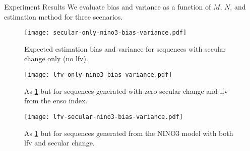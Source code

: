 \begin{block}{Experiment Results}
  We evaluate bias and variance as a function of $M$, $N$, and estimation method for three scenarios.
  \begin{figure}
    \centering
    \texttt{[image: secular-only-nino3-bias-variance.pdf]}
    \caption{
      Expected estimation bias and variance for sequences with secular change only (no \gls{lfv}).
    }\label{fig:secular-nino3-bias-variance}
  \end{figure}
  \begin{figure}
    \centering
    \texttt{[image: lfv-only-nino3-bias-variance.pdf]}
    \caption{
      As \cref{fig:secular-nino3-bias-variance} but for sequences generated with zero secular change and \gls{lfv} from the \gls{enso} index.
    }\label{fig:lfv-nino3-bias-variance}
  \end{figure}
  \begin{figure}
    \centering
    \texttt{[image: lfv-secular-nino3-bias-variance.pdf]}
    \caption{
      As \cref{fig:secular-nino3-bias-variance} but for sequences generated from the NINO3 model with both \gls{lfv} and secular change.
    }\label{fig:lfv-secular-nino3-bias-variance}
  \end{figure}
\end{block}
